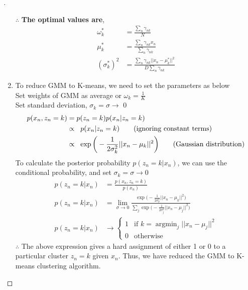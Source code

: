 \documentclass[a4paper, 12pt]{article}
\DeclareMathOperator*{\argmin}{argmin}
\begin{document}
\begin{proof}[]
\begin{enumerate}[label={\color{blue}{\textbf{1.\arabic*})}}]
        $\therefore$ \textbf{The optimal values are}, 
        \begin{align*}
            \omega_k^* &= \frac{\textstyle\sum_n\gamma_{nk}}{N}\\
            \mu_k^* &= \frac{\textstyle
            \sum\nolimits_n{\gamma_{nk}x_n}}{\sum\nolimits_n{\gamma_{nk}}}\\
            (\sigma_k^*)^2 &= \frac{\sum\nolimits_n\gamma_{nk}||x_n - \mu_k^*||^2}{D\sum\nolimits_n\gamma_{nk}}
        \end{align*}
    \item 
        To reduce GMM to K-means, we need to set the parameters as below\\
        Set weights of GMM as average or $\omega_k = \frac{1}{K}$ \\
        Set standard deviation, $\sigma_k = \sigma \to $ 0
        \begin{align*}
            p(x_n, z_n = k) &= p(z_n = k) p(x_n | z_n = k)\\
            &\propto \;\;p(x_n | z_n = k){\tag*{(ignoring constant terms)}}\\
            &\propto \;\; \exp{\bigg(  -\frac{1}{2\sigma_k^2} || x_n - \mu_k ||^2 \bigg)}{\tag*{(Gaussian distribution)}}
        \end{align*}
        To calculate the posterior probability $p(z_n = k | x_n)$, we can use the conditional probability, and set $\sigma_k = \sigma \to 0$
        \begin{align*}
            p(z_n = k | x_n) &= \frac{p(x_n, z_n = k)}{p(x_n)}\\
            p(z_n = k | x_n) &= \lim_{\sigma \to 0}\frac{\exp{\big( -\frac{1}{2\sigma_k^2} || x_n - \mu_k ||^2 \big)}}{\sum\nolimits_j\exp{\big(  -\frac{1}{2\sigma_j^2} || x_n - \mu_j ||^2 \big)}}\\
            p(z_n = k | x_n) &\to \begin{cases} 
              1 & \text{if $k = \argmin_j ||x_n - \mu_j||^2$} \\
              0 & \text{otherwise}
           \end{cases}
        \end{align*}
        $\therefore$ The above expression gives a hard assignment of either 1 or 0 to a particular cluster $z_n = k$ given $x_n$. Thus, we have reduced the GMM to K-means clustering algorithm.
\end{enumerate}
\end{proof}
\end{document}
